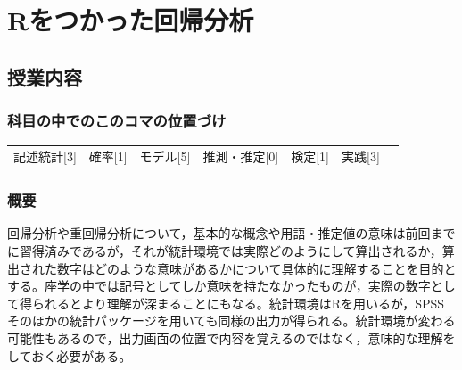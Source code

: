 \section{Rをつかった回帰分析}
\label{s11_Regression_onR}

\subsection{授業内容}
\subsubsection{科目の中でのこのコマの位置づけ}
\begin{tabular}[t]{ccccccc}
	記述統計[3] & 確率[1] & モデル[5] & 推測・推定[0] & 検定[1] & 実践[3]
\end{tabular}
\subsubsection{概要}
回帰分析や重回帰分析について，基本的な概念や用語・推定値の意味は前回までに習得済みであるが，それが統計環境では実際どのようにして算出されるか，算出された数字はどのような意味があるかについて具体的に理解することを目的とする。座学の中では記号としてしか意味を持たなかったものが，実際の数字として得られるとより理解が深まることにもなる。統計環境はRを用いるが，SPSSそのほかの統計パッケージを用いても同様の出力が得られる。統計環境が変わる可能性もあるので，出力画面の位置で内容を覚えるのではなく，意味的な理解をしておく必要がある。
